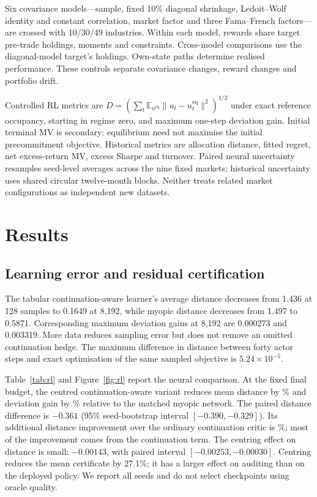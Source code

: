 \documentclass[sigconf,anonymous,review]{acmart}
\newcommand{\eq}{\mathrm{eq}}
\begin{document}
Six covariance models---sample, fixed 10\% diagonal shrinkage, Ledoit--Wolf identity and constant correlation, market factor and three Fama--French factors---are crossed with 10/30/49 industries. Within each model, rewards share target pre-trade holdings, moments and constraints. Cross-model comparisons use the diagonal-model target's holdings. Own-state paths determine realised performance. These controls separate covariance changes, reward changes and portfolio drift.

Controlled RL metrics are $D=(\sum_t\mathbb E_{u^{\eq}}\|u_t-u_t^{\eq}\|^2)^{1/2}$ under exact reference occupancy, starting in regime zero, and maximum one-step deviation gain. Initial terminal MV is secondary: equilibrium need not maximise the initial precommitment objective. Historical metrics are allocation distance, fitted regret, net excess-return MV, excess Sharpe and turnover. Paired neural uncertainty resamples seed-level averages across the nine fixed markets; historical uncertainty uses shared circular twelve-month blocks. Neither treats related market configurations as independent new datasets.

\section{Results}
\subsection{Learning error and residual certification}
The tabular continuation-aware learner's average distance decreases from 1.436 at 128 samples to 0.1649 at 8,192, while myopic distance decreases from 1.497 to 0.5871. Corresponding maximum deviation gains at 8,192 are 0.000273 and 0.003319. More data reduces sampling error but does not remove an omitted continuation hedge. The maximum difference in distance between forty actor steps and exact optimisation of the same sampled objective is $5.24\times10^{-5}$.

Table~\ref{tab:rl} and Figure~\ref{fig:rl} report the neural comparison. At the fixed final budget, the centred continuation-aware variant reduces mean distance by \DistanceReduction\% and deviation gain by \DeviationReduction\% relative to the matched myopic network. The paired distance difference is $-0.361$ (95\% seed-bootstrap interval $[-0.390,-0.329]$). Its additional distance improvement over the ordinary continuation critic is \CentreReduction\%; most of the improvement comes from the continuation term. The centring effect on distance is small: $-0.00143$, with paired interval $[-0.00253,-0.00030]$. Centring reduces the mean certificate by 27.1\%; it has a larger effect on auditing than on the deployed policy. We report all seeds and do not select checkpoints using oracle quality.
\end{document}
